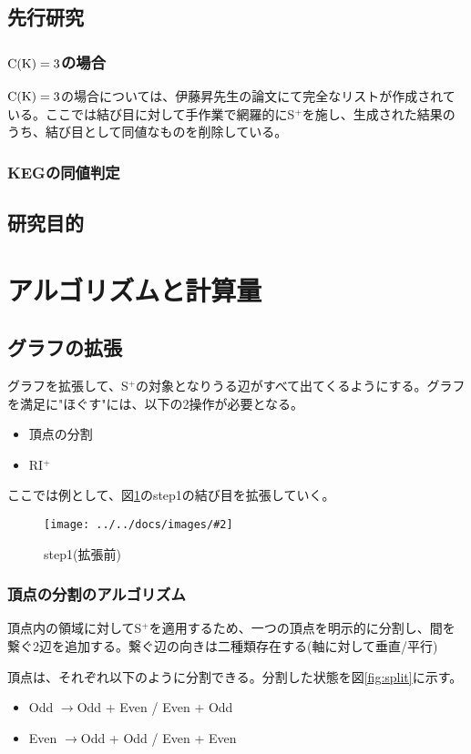 \documentclass[11pt,a4j]{jarticle}
\newcommand{\splus}{S${}^\text{+}$}
\newcommand{\riplus}{RI${}^\text{+}$}
\newcommand{\f}[1]{$\rm{#1}$} %
\newcommand{\image}[4][height=100pt]{%
\begin{figure}[htbp]
    \centering
    \texttt{[image: ../../docs/images/\#2]}
    \caption{#3}
    \label{fig:#4}
\end{figure}%
}
\newcommand{\ra }{$\rightarrow$}
\begin{document}
\subsection{先行研究}
\subsubsection{\f{C(K)=3}の場合}
\f{C(K)=3}の場合については、伊藤昇先生の論文\cite{ck3}にて完全なリストが作成されている。ここでは結び目に対して手作業で網羅的に\splus を施し、生成された結果のうち、結び目として同値なものを削除している。

\subsubsection{KEGの同値判定}

\subsection{研究目的}

\section{アルゴリズムと計算量}

\subsection{グラフの拡張}
グラフを拡張して、\splus の対象となりうる辺がすべて出てくるようにする。グラフを満足に"ほぐす"には、以下の2操作が必要となる。
\begin{itemize}
    \item 頂点の分割
    \item \riplus
\end{itemize}

ここでは例として、図\ref{fig:default}のstep1の結び目を拡張していく。
\image{extend_default.jpg}{step1(拡張前)}{default}

\subsubsection{頂点の分割のアルゴリズム}
頂点内の領域に対して\splus を適用するため、一つの頂点を明示的に分割し、間を繋ぐ2辺を追加する。繋ぐ辺の向きは二種類存在する(軸に対して垂直/平行)

頂点は、それぞれ以下のように分割できる。分割した状態を図\ref{fig:split}に示す。
\begin{itemize}
    \item Odd \ra  Odd + Even / Even + Odd
    \item Even \ra  Odd + Odd / Even + Even
\end{itemize}
\end{document}
